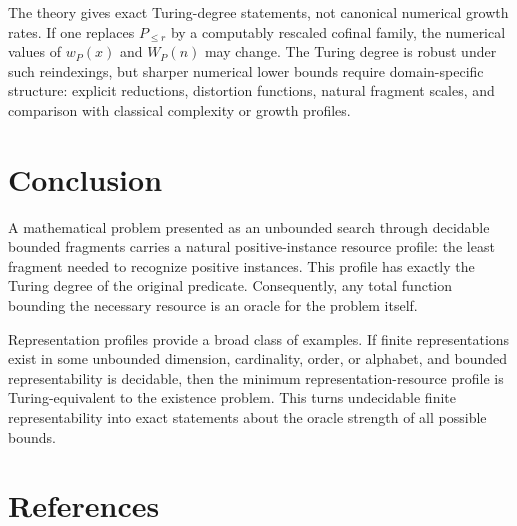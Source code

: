\documentclass[11pt]{article}
\begin{document}
The theory gives exact Turing-degree statements, not canonical numerical growth rates. If one replaces \(P_{\le r}\) by a computably rescaled cofinal family, the numerical values of \(w_P(x)\) and \(W_P(n)\) may change. The Turing degree is robust under such reindexings, but sharper numerical lower bounds require domain-specific structure: explicit reductions, distortion functions, natural fragment scales, and comparison with classical complexity or growth profiles.

\section{Conclusion}

A mathematical problem presented as an unbounded search through decidable bounded fragments carries a natural positive-instance resource profile: the least fragment needed to recognize positive instances. This profile has exactly the Turing degree of the original predicate. Consequently, any total function bounding the necessary resource is an oracle for the problem itself.

Representation profiles provide a broad class of examples. If finite representations exist in some unbounded dimension, cardinality, order, or alphabet, and bounded representability is decidable, then the minimum representation-resource profile is Turing-equivalent to the existence problem. This turns undecidable finite representability into exact statements about the oracle strength of all possible bounds.

\section*{References}
\end{document}
